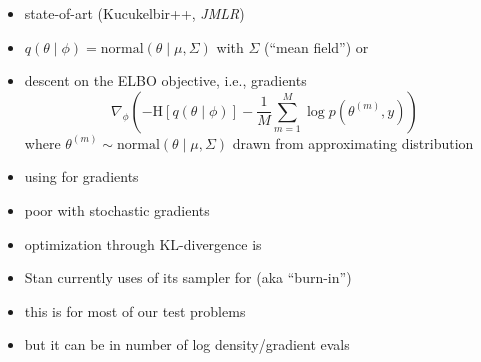 \documentclass[9pt]{report}
\begin{document}
\begin{itemize}
\item state-of-art  (Kucukelbir++, \textit{JMLR})
\item $q(\theta \mid \phi) = \textrm{normal}(\theta \mid \mu, \Sigma)$ with $\Sigma$  (``mean field'') or 
\item {} descent on the ELBO objective, i.e., gradients
  \[
    \nabla_{\phi} \left( -\textrm{H}\!\left[q(\theta \mid \phi)\right] - \frac{1}{M} \sum_{m=1}^M \log p(\theta^{(m)}, y) \right)
  \]
  where $\theta^{(m)} \sim \textrm{normal}(\theta \mid \mu, \Sigma)$ drawn from approximating distribution
\item using  for gradients
\item poor  with stochastic gradients
\item optimization through KL-divergence is 
\end{itemize}

\begin{itemize}
\item Stan currently uses  of its sampler for  (aka ``burn-in'')
\item this is  for most of our test problems 
\item but it can be  in number of log density/gradient evals
\end{itemize}
\end{document}
